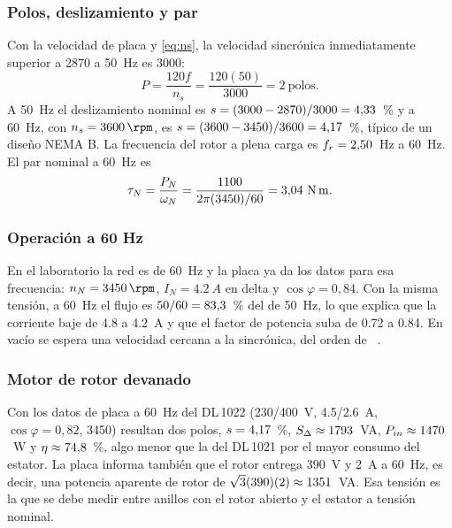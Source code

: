 \documentclass[conference]{IEEEtran}
\begin{document}
\subsubsection{Polos, deslizamiento y par}
Con la velocidad de placa y \eqref{eq:ns}, la velocidad sincrónica inmediatamente superior a \SI{2870}{\rpm} a \SI{50}{Hz} es \SI{3000}{\rpm}:
\begin{equation}
P=\frac{120f}{n_s}=\frac{120(50)}{3000}=2\ \text{polos}.
\label{eq:polos}
\end{equation}
A \SI{50}{Hz} el deslizamiento nominal es $s=(3000-2870)/3000=\DLs$~\% y a \SI{60}{Hz}, con $n_s=\SI{3600}{\rpm}$, es $s=(3600-3450)/3600=\DLsSes$~\%, típico de un diseño NEMA B. La frecuencia del rotor a plena carga es $f_r=\DLfrSes$~\si{Hz} a \SI{60}{Hz}. El par nominal a \SI{60}{Hz} es
\begin{equation}
\tau_N=\frac{P_N}{\omega_N}=\frac{1100}{2\pi(3450)/60}=\DLTsesenta~\si{N.m}.
\label{eq:parn}
\end{equation}

\subsubsection{Operación a 60 Hz}
En el laboratorio la red es de \SI{60}{Hz} y la placa ya da los datos para esa frecuencia: $n_N=\SI{3450}{\rpm}$, $I_N=\SI{4,2}{A}$ en delta y $\cos\varphi=0{,}84$. Con la misma tensión, a \SI{60}{Hz} el flujo es $50/60=\DLflujo$~\% del de \SI{50}{Hz}, lo que explica que la corriente baje de \num{4,8} a \SI{4,2}{A} y que el factor de potencia suba de \num{0,72} a \num{0,84}. En vacío se espera una velocidad cercana a la sincrónica, del orden de \DLnVac~\si{\rpm}.

\subsubsection{Motor de rotor devanado}
Con los datos de placa a \SI{60}{Hz} del DL\,1022 (\num{230}/\SI{400}{V}, \num{4,5}/\SI{2,6}{A}, $\cos\varphi=0{,}82$, \SI{3450}{\rpm}) resultan dos polos, $s=\DLsSes$~\%, $S_\Delta\approx\DLdSD$~\si{VA}, $P_{in}\approx\DLdPin$~\si{W} y $\eta\approx\DLdeta$~\%, algo menor que la del DL\,1021 por el mayor consumo del estator. La placa informa también que el rotor entrega \SI{390}{V} y \SI{2}{A} a \SI{60}{Hz}, es decir, una potencia aparente de rotor de $\sqrt3(390)(2)\approx\DLdSrot$~\si{VA}. Esa tensión es la que se debe medir entre anillos con el rotor abierto y el estator a tensión nominal.
\end{document}
